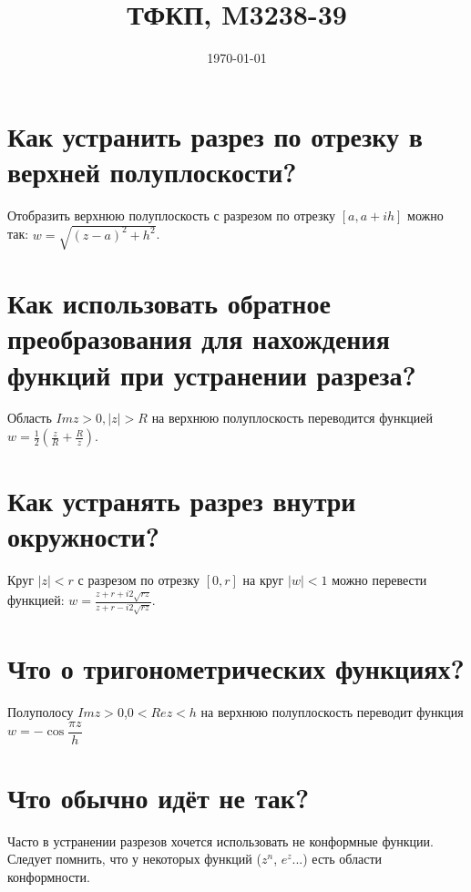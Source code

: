 \documentclass{article}
\title{ТФКП, M3238-39}
\date{\today}
\begin{document}
\maketitle


\section*{Как устранить разрез по отрезку в верхней полуплоскости?}

Отобразить верхнюю полуплоскость с разрезом по отрезку $[a, a + ih]$ можно так: $w = \sqrt{(z-a)^2+h^2}$.

\section*{Как использовать обратное преобразования для нахождения функций при устранении разреза?}

Область $Imz>0, \vert z \vert >R$ на верхнюю полуплоскость переводится функцией $w=\frac{1}{2}(\frac{z}{R}+\frac{R}{z})$.

\section*{Как устранять разрез внутри окружности?}

Круг $\vert z \vert < r$ с разрезом по отрезку $[0, r]$ на круг $\vert w \vert < 1$ можно перевести функцией: $w=\frac{z + r + i 2\sqrt{rz}}{z + r - i 2\sqrt{rz}}$.

\section*{Что о тригонометрических функциях?}

Полуполосу $Im z > 0$,$ 0 < Re z < h$ на верхнюю полуплоскость переводит функция $w=-\cos \dfrac{\pi z}{h}$

\section*{Что обычно идёт не так?}

Часто в устранении разрезов хочется использовать не конформные функции. Следует помнить, что у некоторых функций ($z^n$, $e^z$...) есть области конформности.
\end{document}
